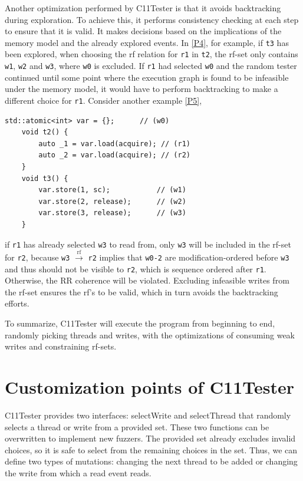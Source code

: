 Another optimization performed by C11Tester is that it avoids backtracking during exploration. To achieve this, it performs consistency checking at each step to ensure that it is valid. It makes decisions based on the implications of the memory model and the already explored events. In \ref{P4}, for example, if \texttt{t3} has been explored, when choosing the rf relation for \texttt{r1} in \texttt{t2}, the rf-set only contains \texttt{w1}, \texttt{w2} and \texttt{w3}, where \texttt{w0} is excluded. If \texttt{r1} had selected \texttt{w0} and the random tester continued until some point where the execution graph is found to be infeasible under the memory model, it would have to perform backtracking to make a different choice for \texttt{r1}. Consider another example \ref{P5},
\begin{lstlisting}[caption={P5}, label={P5}]
    std::atomic<int> var = {};      // (w0)
    void t2() {
        auto _1 = var.load(acquire); // (r1)
        auto _2 = var.load(acquire); // (r2)
    }
    void t3() {
        var.store(1, sc);           // (w1)
        var.store(2, release);      // (w2)
        var.store(3, release);      // (w3)
    }
\end{lstlisting}
if \texttt{r1} has already selected \texttt{w3} to read from, only \texttt{w3} will be included in the rf-set for \texttt{r2}, because \texttt{w3} $\xrightarrow{\text{rf}}$ \texttt{r2} implies that \texttt{w0-2} are modification-ordered before \texttt{w3} and thus should not be visible to \texttt{r2}, which is sequence ordered after \texttt{r1}. Otherwise, the RR coherence will be violated. Excluding infeasible writes from the rf-set ensures the rf's to be valid, which in turn avoids the backtracking efforts.

To summarize, C11Tester will execute the program from beginning to end, randomly picking threads and writes, with the optimizations of consuming weak writes and constraining rf-sets.

\section{Customization points of C11Tester}

C11Tester provides two interfaces: selectWrite and selectThread that randomly selects a thread or write from a provided set. These two functions can be overwritten to implement new fuzzers. The provided set already excludes invalid choices, so it is safe to select from the remaining choices in the set. Thus, we can define two types of mutations: changing the next thread to be added or changing the write from which a read event reads.

